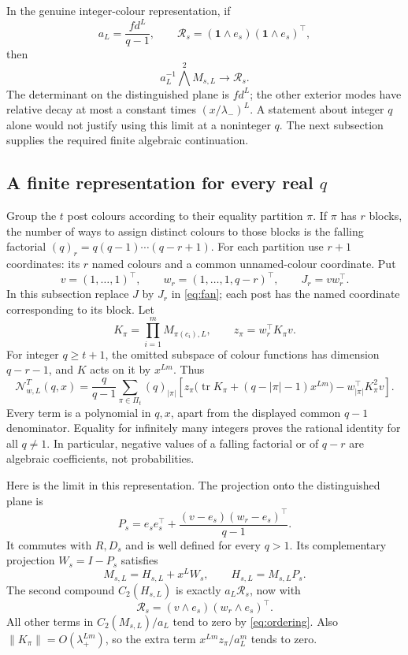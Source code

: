 \documentclass[11pt,a4paper]{article}
\theoremstyle{remark}\newtheorem{remark}[theorem]{Remark}
\DeclareMathOperator{\tr}{tr}\DeclareMathOperator{\diag}{diag}
\newcommand{\one}{\mathbf 1}\newcommand{\N}{\mathcal N}
\newcommand{\R}{\mathcal R}\newcommand{\CC}{\mathcal C}
\begin{document}
In the genuine integer-colour representation, if
\[
a_L=\frac{fd^L}{q-1},\qquad \R_s=(\one\wedge e_s)(\one\wedge e_s)^\top,
\]
then
\begin{equation}\label{eq:wedge-limit}
a_L^{-1}\bigwedge^2 M_{s,L}\longrightarrow\R_s.
\end{equation}
The determinant on the distinguished plane is $fd^L$; the other exterior modes have relative decay at most a constant times $(x/\lambda_-)^L$.
A statement about integer $q$ alone would not justify using this limit at a noninteger $q$. The next subsection supplies the required finite algebraic continuation.

\subsection{A finite representation for every real $q$}\label{sec:continuation}
Group the $t$ post colours according to their equality partition $\pi$. If $\pi$ has $r$ blocks, the number of ways to assign distinct colours to those blocks is the falling factorial $(q)_r=q(q-1)\cdots(q-r+1)$.
For each partition use $r+1$ coordinates: its $r$ named colours and a common unnamed-colour coordinate. Put
\[
v=(1,\ldots,1)^\top,\qquad w_r=(1,\ldots,1,q-r)^\top,
\qquad J_r=vw_r^\top.
\]
In this subsection replace $J$ by $J_r$ in \eqref{eq:fan}; each post has the named coordinate corresponding to its block. Let
\[
K_\pi=\prod_{i=1}^m M_{\pi(c_i),L},\qquad z_\pi=w_r^\top K_\pi v.
\]
For integer $q\ge t+1$, the omitted subspace of colour functions has dimension $q-r-1$, and $K$ acts on it by $x^{Lm}$. Thus
\begin{equation}\label{eq:finite}
\N_{w,L}^{T}(q,x)=\frac q{q-1}\sum_{\pi\in\Pi_t}(q)_{|\pi|}
\left[z_\pi\big(\tr K_\pi+(q-|\pi|-1)x^{Lm}\big)
-w_{|\pi|}^\top K_\pi^2v\right].
\end{equation}
Every term is a polynomial in $q,x$, apart from the displayed common $q-1$ denominator. Equality for infinitely many integers proves the rational identity for all $q\ne1$. In particular, negative values of a falling factorial or of $q-r$ are algebraic coefficients, not probabilities.

Here is the limit in this representation. The projection onto the distinguished plane is
\[
P_s=e_se_s^\top+\frac{(v-e_s)(w_r-e_s)^\top}{q-1}.
\]
It commutes with $R,D_s$ and is well defined for every $q>1$. Its complementary projection $W_s=I-P_s$ satisfies
\[
M_{s,L}=H_{s,L}+x^LW_s,\qquad H_{s,L}=M_{s,L}P_s.
\]
The second compound $C_2(H_{s,L})$ is exactly $a_L\R_s$, now with
\begin{equation}\label{eq:rankone}
\R_s=(v\wedge e_s)(w_r\wedge e_s)^\top.
\end{equation}
All other terms in $C_2(M_{s,L})/a_L$ tend to zero by \eqref{eq:ordering}. Also
$\|K_\pi\|=O(\lambda_+^{Lm})$, so the extra term
$x^{Lm}z_\pi/a_L^m$ tends to zero.
\end{document}
